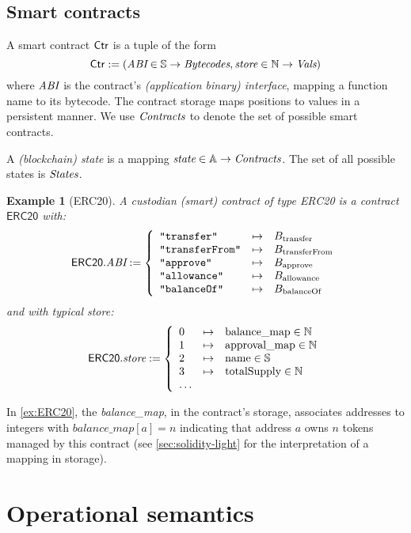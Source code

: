 \documentclass[12pt]{extarticle}
\newtheorem{example}{Example}
\begin{document}
\subsection{Smart contracts}
A smart contract $\mathsf{Ctr}$ is a tuple of the form $$\mathsf{Ctr}:=(\textit{ABI}\in \mathbb{S}\to \textit{Bytecodes}, \textit{store}\in \mathbb{N}\to \textit{Vals})$$ where $\textit{ABI}$ is the contract's \emph{(application binary) interface}, mapping a function name to its bytecode. The contract storage maps positions to values in a persistent manner. We use $\textit{Contracts}$ to denote the set of possible smart contracts.

A \emph{(blockchain) state} is a mapping $\textit{state}\in \mathbb{A}\to\textit{Contracts}$. The set of all possible states is $\textit{States}$.

\begin{example}[ERC20]\label{ex:ERC20}
A custodian (smart) contract of type ERC20 is a contract $\mathsf{ERC20}$ with:
$$
\mathsf{ERC20}.\textit{ABI} := \left\{
\begin{array}{lll}
\hbox{\rm\texttt{"transfer"}} &\mapsto& B_{\textrm{transfer}}\\
\hbox{\rm\texttt{"transferFrom"}} &\mapsto& B_{\textrm{transferFrom}}\\
\hbox{\rm\texttt{"approve"}}&\mapsto& B_{\textrm{approve}} \\
\hbox{\rm\texttt{"allowance"}}&\mapsto& B_{\textrm{allowance}} \\
\hbox{\rm\texttt{"balanceOf"}}&\mapsto& B_{\textrm{balanceOf}}
\end{array}\right.
$$
and with typical store:
$$
\mathsf{ERC20}.\textit{store} := \left\{
\begin{array}{lll}
0 &\mapsto& \textrm{balance\_map}\in \mathbb{N} \\
1 &\mapsto& \textrm{approval\_map}\in \mathbb{N} \\
2 & \mapsto& \textrm{name}\in \mathbb{S} \\
3 & \mapsto& \textrm{totalSupply}\in\mathbb{N} \\
\dots
\end{array}\right.
$$
\end{example}

In \autoref{ex:ERC20}, the \textit{balance\_map}, in the contract's storage, associates addresses to integers with $\mathit{balance\_map}[a]=n$ indicating that address $a$ owns $n$ tokens managed by this contract (see \autoref{sec:solidity-light} for the interpretation of a mapping in storage).

\section{Operational semantics}
\end{document}
